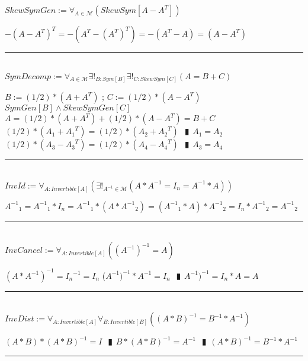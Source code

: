 \documentclass{book}
\newcommand{\abr}{:=}
\newcommand{\pipe}{$\phantom{(}\vrectangleblack\phantom{)}$}
\newcommand{\pr}[1]{\left(#1\right)}
\begin{document}
$SkewSymGen \abr \forall_{A \in \mathcal{M}}(SkewSym[A - A^T])$
\begin{enumerate}
  \lit $-(A - A^T)^T = -\pr{A^T - (A^T)^T} = -(A^T - A) = (A - A^T)$
\end{enumerate} \vspace{.75mm} \hrule \vspace{.75mm} \ \\ 

$SymDecomp \abr \forall_{A \in \mathcal{M}} \exists!_{B : Sym[B]} \exists!_{C : SkewSym[C]}(A = B + C)$
\begin{enumerate}
  \lit $B \abr (1 / 2) * (A + A^T)$ ; $C \abr (1 / 2) * (A - A^T)$
  \lit $SymGen[B] \land SkewSymGen[C]$
  \lit $A = (1 / 2) * (A + A^T) + (1 / 2) * (A - A^T) = B + C$
  \lit $(1 / 2) * (A_1 + {A_1}^T) = (1 / 2) * (A_2 + {A_2}^T)$ \pipe $A_1 = A_2$
  \lit $(1 / 2) * (A_3 - {A_3}^T) = (1 / 2) * (A_4 - {A_4}^T)$ \pipe $A_3 = A_4$
\end{enumerate} \vspace{.75mm} \hrule \vspace{.75mm} \ \\ 

$InvId \abr \forall_{A : Invertible[A]}\pr{\exists!_{A^{-1} \in \mathcal{M}}(A * A^{-1} = I_n = A^{-1} * A)}$
\begin{enumerate}
  \lit ${A^{-1}}_{1} = {A^{-1}}_{1} * I_n = {A^{-1}}_{1} * (A * {A^{-1}}_{2}) = ({A^{-1}}_{1} * A) * {A^{-1}}_{2} = I_n * {A^{-1}}_{2} = {A^{-1}}_{2}$
\end{enumerate} \vspace{.75mm} \hrule \vspace{.75mm} \ \\ 

$InvCancel \abr \forall_{A : Invertible[A]}\pr{(A^{-1})^{-1} = A}$
\begin{enumerate}
  \lit $(A * A^{-1})^{-1} = {I_n}^{-1} = I_n$
  \lit ($A^{-1})^{-1} * A^{-1} = I_n$ \pipe $A^{-1})^{-1} = I_n * A = A$
\end{enumerate} \vspace{.75mm} \hrule \vspace{.75mm} \ \\ 

$InvDist \abr \forall_{A : Invertible[A]} \forall_{B : Invertible[B]}\pr{(A * B)^{-1} = B^{-1} * A^{-1}}$
\begin{enumerate}
  \lit $(A * B) * (A * B)^{-1} = I$ \pipe $B * (A * B)^{-1} = A^{-1}$ \pipe $(A * B)^{-1} = B^{-1} * A^{-1}$
\end{enumerate} \vspace{.75mm} \hrule \vspace{.75mm} \ \\ 
\end{document}
